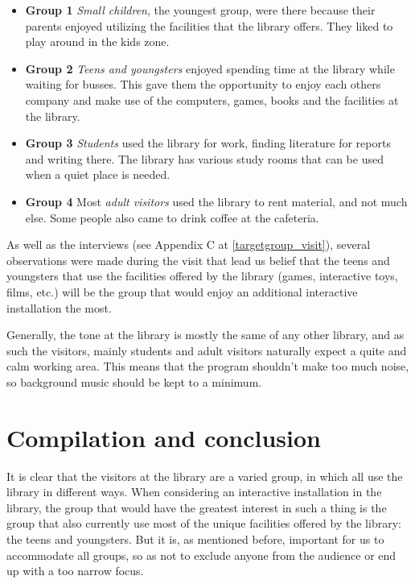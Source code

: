 \begin{itemize}

\item \textbf{Group 1} \textit{Small children}, the youngest group, were there because their parents enjoyed utilizing the facilities that the library offers. They liked to play around in the kids zone.

\item \textbf{Group 2} \textit{Teens and youngsters} enjoyed spending time at the library while waiting for busses. This gave them the opportunity to enjoy each others company and make use of the computers, games, books and the facilities at the library.

\item \textbf{Group 3} \textit{Students} used the library for work, finding literature for reports and writing there. The library has various study rooms that can be used when a quiet place is needed.

\item \textbf{Group 4} Most \textit{adult visitors} used the library to rent material, and not much else. Some people also came to drink coffee at the cafeteria.

\end{itemize}

As well as the interviews (see Appendix C at \ref{targetgroup_visit}), several observations were made during the visit that lead us belief that the teens and youngsters that use the facilities offered by the library (games, interactive toys, films, etc.) will be the group that would enjoy an additional interactive installation the most.

Generally, the tone at the library is mostly the same of any other library, and as such the visitors, mainly students and adult visitors naturally expect a quite and calm working area. This means that the program shouldn't make too much noise, so background music should be kept to a minimum.

\section{Compilation and conclusion}

It is clear that the visitors at the library are a varied group, in which all use the library in different ways. When considering an interactive installation in the library, the group that would have the greatest interest in such a thing is the group that also currently use most of the unique facilities offered by the library: the teens and youngsters. But it is, as mentioned before, important for us to accommodate all groups, so as not to exclude anyone from the audience or end up with a too narrow focus.

